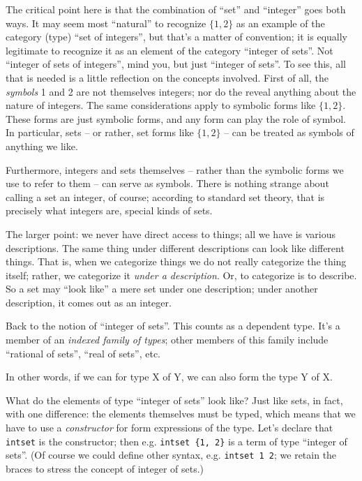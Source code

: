 The critical point here is that the combination of ``set'' and
``integer'' goes both ways.  It may seem most ``natural'' to recognize
\( \{1, 2\}\) as an example of the category (type) ``set of
integers'', but that's a matter of convention; it is equally
legitimate to recognize it as an element of the category ``integer of
sets''.  Not ``integer of sets of integers'', mind you, but just
``integer of sets''.  To see this, all that is needed is a little
reflection on the concepts involved.  First of all, the
\textit{symbols} 1 and 2 are not themselves integers; nor do the
reveal anything about the nature of integers.  The same considerations
apply to symbolic forms like \(\{1, 2\}\).  These forms are just
symbolic forms, and any form can play the role of symbol.  In
particular, sets -- or rather, set forms like \( \{1, 2\}\) -- can be
treated as symbols of anything we like.

Furthermore, integers and sets themselves -- rather than the symbolic
forms we use to refer to them -- can serve as symbols.  There is
nothing strange about calling a set an integer, of course; according
to standard set theory, that is precisely what integers are, special
kinds of sets.

The larger point: we never have direct access to things; all we have
is various descriptions.  The same thing under different descriptions
can look like different things.  That is, when we categorize things we
do not really categorize the thing itself; rather, we categorize it
\textit{under a description}.  Or, to categorize is to describe.  So a
set may ``look like'' a mere set under one description; under another
description, it comes out as an integer.

Back to the notion of ``integer of sets''.  This counts as a dependent
type.  It's a member of an \textit{indexed family of types}; other
members of this family include ``rational of sets'', ``real of sets'',
etc.

In other words, if we can for type X of Y, we can also form the type Y
of X.

What do the elements of type ``integer of sets'' look like?  Just like
sets, in fact, with one difference: the elements themselves must be
typed, which means that we have to use a \textit{constructor} for form
expressions of the type.  Let's declare that \texttt{intset} is the
constructor; then e.g. \texttt{intset \{1, 2\}} is a term of type
``integer of sets''.  (Of course we could define other syntax,
e.g. \texttt{intset 1 2}; we retain the braces to stress the concept
of integer of sets.)

